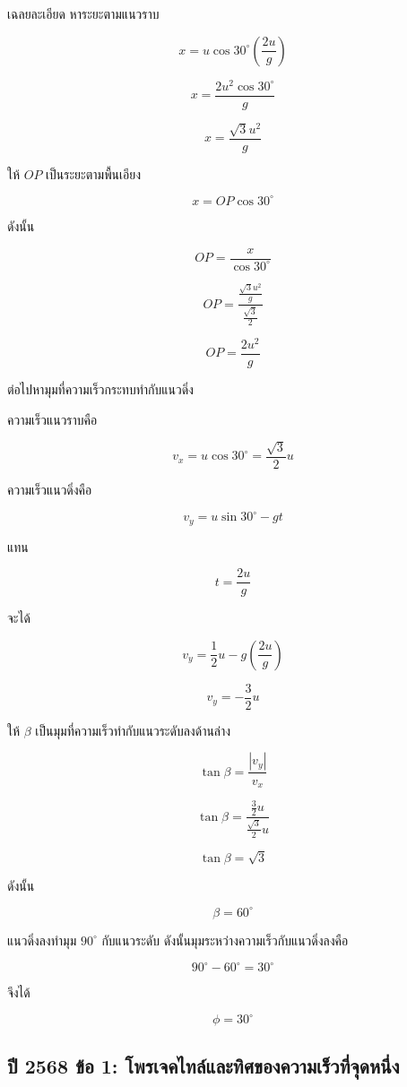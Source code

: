 \begin{examplebox}{เฉลยละเอียด}
หาระยะตามแนวราบ

\[
x=u\cos30^\circ\left(\frac{2u}{g}\right)
\]

\[
x=\frac{2u^2\cos30^\circ}{g}
\]

\[
x=\frac{\sqrt{3}u^2}{g}
\]

ให้ $OP$ เป็นระยะตามพื้นเอียง

\[
x=OP\cos30^\circ
\]

ดังนั้น

\[
OP=\frac{x}{\cos30^\circ}
\]

\[
OP=
\frac{\frac{\sqrt{3}u^2}{g}}{\frac{\sqrt{3}}{2}}
\]

\[
\boxed{OP=\frac{2u^2}{g}}
\]

ต่อไปหามุมที่ความเร็วกระทบทำกับแนวดิ่ง

ความเร็วแนวราบคือ

\[
v_x=u\cos30^\circ=\frac{\sqrt{3}}{2}u
\]

ความเร็วแนวดิ่งคือ

\[
v_y=u\sin30^\circ-gt
\]

แทน

\[
t=\frac{2u}{g}
\]

จะได้

\[
v_y=\frac{1}{2}u-g\left(\frac{2u}{g}\right)
\]

\[
v_y=-\frac{3}{2}u
\]

ให้ $\beta$ เป็นมุมที่ความเร็วทำกับแนวระดับลงด้านล่าง

\[
\tan\beta=\frac{|v_y|}{v_x}
\]

\[
\tan\beta=
\frac{\frac{3}{2}u}{\frac{\sqrt{3}}{2}u}
\]

\[
\tan\beta=\sqrt{3}
\]

ดังนั้น

\[
\beta=60^\circ
\]

แนวดิ่งลงทำมุม $90^\circ$ กับแนวระดับ ดังนั้นมุมระหว่างความเร็วกับแนวดิ่งลงคือ

\[
90^\circ-60^\circ=30^\circ
\]

จึงได้

\[
\boxed{\phi=30^\circ}
\]
\end{examplebox}

\subsection{ปี 2568 ข้อ 1: โพรเจคไทล์และทิศของความเร็วที่จุดหนึ่ง}

\vspace{1.5em}

